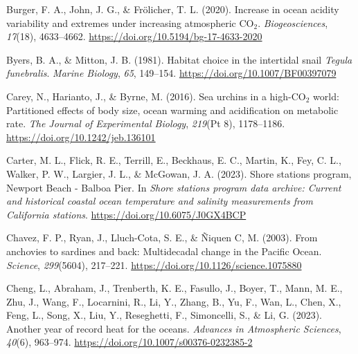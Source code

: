 \documentclass{CSUNthesis}
\begin{document}
\vspace{0.1em}

Burger, F. A., John, J. G., \& Frölicher, T. L. (2020). Increase in ocean acidity variability and extremes under increasing atmospheric CO\(_2\). \textit{Biogeosciences}, \textit{17}(18), 4633--4662. \url{https://doi.org/10.5194/bg-17-4633-2020}

\vspace{0.1em}

Byers, B. A., \& Mitton, J. B. (1981). Habitat choice in the intertidal snail \textit{Tegula funebralis}. \textit{Marine Biology}, \textit{65}, 149--154. \url{https://doi.org/10.1007/BF00397079}

\vspace{0.1em}

Carey, N., Harianto, J., \& Byrne, M. (2016). Sea urchins in a high-CO\(_2\) world: Partitioned effects of body size, ocean warming and acidification on metabolic rate. \textit{The Journal of Experimental Biology}, \textit{219}(Pt 8), 1178--1186. \url{https://doi.org/10.1242/jeb.136101}

\vspace{0.1em}

Carter, M. L., Flick, R. E., Terrill, E., Beckhaus, E. C., Martin, K., Fey, C. L., Walker, P. W., Largier, J. L., \& McGowan, J. A. (2023). Shore stations program, Newport Beach - Balboa Pier. In \textit{Shore stations program data archive: Current and historical coastal ocean temperature and salinity measurements from California stations}. \url{https://doi.org/10.6075/J0GX4BCP}

\vspace{0.1em}

Chavez, F. P., Ryan, J., Lluch-Cota, S. E., \& Ñiquen C, M. (2003). From anchovies to sardines and back: Multidecadal change in the Pacific Ocean. \textit{Science}, \textit{299}(5604), 217--221. \url{https://doi.org/10.1126/science.1075880}

\vspace{0.1em}

Cheng, L., Abraham, J., Trenberth, K. E., Fasullo, J., Boyer, T., Mann, M. E., Zhu, J., Wang, F., Locarnini, R., Li, Y., Zhang, B., Yu, F., Wan, L., Chen, X., Feng, L., Song, X., Liu, Y., Reseghetti, F., Simoncelli, S., \& Li, G. (2023). Another year of record heat for the oceans. \textit{Advances in Atmospheric Sciences}, \textit{40}(6), 963--974. \url{https://doi.org/10.1007/s00376-0232385-2}

\vspace{0.1em}
\end{document}
